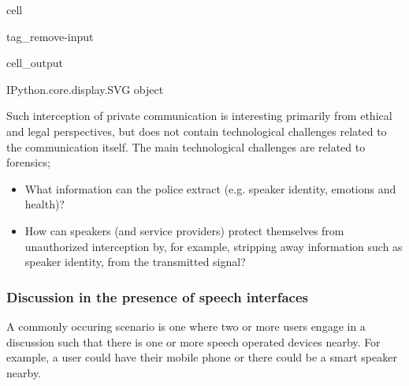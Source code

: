 \documentclass[letterpaper,10pt,english]{jupyterBook}
\begin{document}
\begin{sphinxuseclass}{cell}
\begin{sphinxuseclass}{tag_remove-input}\begin{sphinxVerbatimOutput}

\begin{sphinxuseclass}{cell_output}
\begin{sphinxVerbatim}[commandchars=\\\{\}]
\PYGZlt{}IPython.core.display.SVG object\PYGZgt{}
\end{sphinxVerbatim}

\end{sphinxuseclass}\end{sphinxVerbatimOutput}

\end{sphinxuseclass}
\end{sphinxuseclass}
\sphinxAtStartPar
Such interception of private communication is interesting primarily from ethical and legal perspectives, but does not contain technological challenges related to the communication itself. The main technological challenges are related to forensics;
\begin{itemize}
\item {} 
\sphinxAtStartPar
What information can the police extract (e.g. speaker identity, emotions and health)?

\item {} 
\sphinxAtStartPar
How can speakers (and service providers) protect themselves from unauthorized interception by, for example, stripping away information such as speaker identity, from the transmitted signal?

\end{itemize}


\subsubsection{Discussion in the presence of speech interfaces}
\label{\detokenize{Security_and_privacy:discussion-in-the-presence-of-speech-interfaces}}
\sphinxAtStartPar
A commonly occuring scenario is one where two or more users engage in a discussion such that there is one or more speech operated devices nearby. For example, a user could have their mobile phone or there could be a smart speaker nearby.
\end{document}
